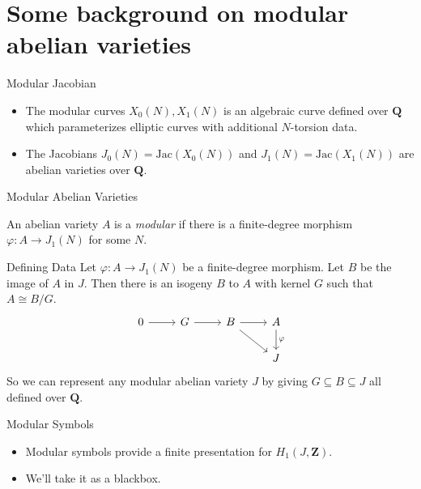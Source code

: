 \documentclass{beamer}
\newcommand{\QQ}{\mathbf{Q}}
\newcommand{\ZZ}{\mathbf{Z}}
\newcommand{\Jac}{\mathrm{Jac}}
\renewcommand{\ZZ}{\mathbf{Z}}
\begin{document}
\section{Some background on modular abelian varieties}

\begin{frame}{Modular Jacobian}
    \begin{itemize}
        \item
            The modular curves $X_0(N), X_1(N)$ is an algebraic curve defined
            over $\QQ$ which parameterizes elliptic curves with additional
            $N$-torsion data.
        \item
            The Jacobians $J_0(N)=\Jac(X_0(N))$ and $J_1(N)=\Jac(X_1(N))$ are
            abelian varieties over $\QQ$.
    \end{itemize}
\end{frame}

\begin{frame}{Modular Abelian Varieties}
    \begin{definition}
        An abelian variety $A$ is a \emph{modular} if there is a finite-degree
        morphism $\varphi:A\to J_1(N)$ for some $N$.
    \end{definition}
\end{frame}

\begin{frame}[fragile]{Defining Data}
    Let $\varphi:A\to J_1(N)$ be a finite-degree morphism. Let $B$ be the image
    of $A$ in $J$. Then there is an isogeny $B$ to $A$ with kernel $G$ such
    that $A\cong B/G$.
    \begin{equation*}
        \label{eq:defining_data}
        \begin{tikzcd}
            0 \arrow[r]
            &
            G \arrow[r]
            &
            B \arrow[r]\arrow[rd]
            &
            A \arrow[d, "\varphi"]
            \\
            &
            &
            &
            J
        \end{tikzcd}
    \end{equation*}
    So we can represent any modular abelian variety $J$ by giving $G\subseteq
    B\subseteq J$ all defined over $\QQ$.
\end{frame}

\begin{frame}{Modular Symbols}
    \begin{itemize}
        \item
            Modular symbols provide a finite presentation for $H_1(J, \ZZ)$.
        \item
            We'll take it as a blackbox.
    \end{itemize}
\end{frame}
\end{document}
